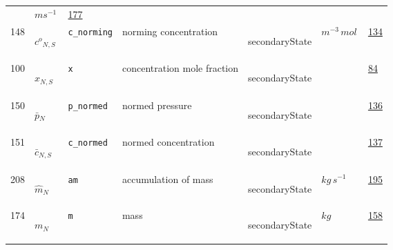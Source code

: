 \begin{longtable}{|p{1cm}|p{2.5cm}|p{4.5cm}|p{8cm}|p{3.0cm}|p{3cm}|p{1cm}|}
             & $ m s^{-1} \, $
             &                 \hyperlink{"e:177"}{ 177 }
                 \\
            148
             & \hypertarget{"v:148"}{ $ {{c^o}}{_{N, S}} $}
             & \verb|c_norming|
             & norming concentration
             & \begin{lay}secondaryState \end{lay}
             & $ m^{-3} \,mol \, $
             &                 \hyperlink{"e:134"}{ 134 }
                 \\
            100
             & \hypertarget{"v:100"}{ $ {x}{_{N, S}} $}
             & \verb|x|
             & concentration mole fraction
             & \begin{lay}secondaryState \end{lay}
             & $  $
             &                 \hyperlink{"e:84"}{ 84 }
                 \\
            150
             & \hypertarget{"v:150"}{ $ {{\bar{p}}}{_{N}} $}
             & \verb|p_normed|
             & normed pressure
             & \begin{lay}secondaryState \end{lay}
             & $  $
             &                 \hyperlink{"e:136"}{ 136 }
                 \\
            151
             & \hypertarget{"v:151"}{ $ {{\bar{c}}}{_{N, S}} $}
             & \verb|c_normed|
             & normed concentration
             & \begin{lay}secondaryState \end{lay}
             & $  $
             &                 \hyperlink{"e:137"}{ 137 }
                 \\
            208
             & \hypertarget{"v:208"}{ $ {{\hat{m}}}{_{N}} $}
             & \verb|am|
             & accumulation of mass
             & \begin{lay}secondaryState \end{lay}
             & $ kg \,s^{-1} \, $
             &                 \hyperlink{"e:195"}{ 195 }
                 \\
            174
             & \hypertarget{"v:174"}{ $ {m}{_{N}} $}
             & \verb|m|
             & mass
             & \begin{lay}secondaryState \end{lay}
             & $ kg \, $
             &                 \hyperlink{"e:158"}{ 158 }
                 \\

\end{longtable}

